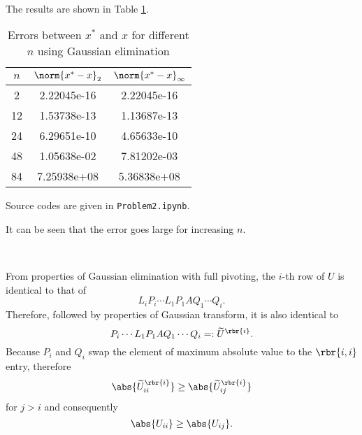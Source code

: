 \documentclass[english, nochinese]{../textmpls/pkupaper}
\begin{document}
\begin{thmquestion}
\ 
\begin{thmanswer}
The results are shown in Table \ref{Tbl:Gauss}.

\begin{table}[htbp]
\centering
\begin{tabular}{|c|c|c|}
\hline
$n$ & $ \norm{ x^{\ast} - x }_2 $ & $ \norm{ x^{\ast} - x }_{\infty} $ \\
\hline
2 & 2.22045e-16 & 2.22045e-16 \\
\hline
12 & 1.53738e-13 & 1.13687e-13 \\
\hline
24 & 6.29651e-10 & 4.65633e-10 \\
\hline
48 & 1.05638e-02 & 7.81202e-03 \\
\hline
84 & 7.25938e+08 & 5.36838e+08 \\
\hline
\end{tabular}
\caption{Errors between $x^{\ast}$ and $x$ for different $n$ using Gaussian elimination}
\label{Tbl:Gauss}
\end{table}
Source codes are given in \verb"Problem2.ipynb".

It can be seen that the error goes large for increasing $n$.
\end{thmanswer}
\end{thmquestion}

\begin{thmquestion}
\ 
\begin{thmproof}
From properties of Gaussian elimination with full pivoting, the $i$-th row of $U$ is identical to that of
\begin{equation}
L_i P_i \cdots L_1 P_1 A Q_1 \cdots Q_i.
\end{equation}
Therefore, followed by properties of Gaussian transform, it is also identical to
\begin{equation}
P_i \cdots L_1 P_1 A Q_1 \cdots Q_i =: \widetilde{U}^{\rbr{i}}.
\end{equation}
Because $P_i$ and $Q_i$ swap the element of maximum absolute value to the $ \rbr{ i, i } $ entry, therefore
\begin{equation}
\abs{\widetilde{U}^{\rbr{i}}_{ i i }} \ge \abs{\widetilde{U}^{\rbr{i}}_{ i j }}
\end{equation}
for $ j > i $ and consequently
\begin{equation}
\abs{U_{ i i }} \ge \abs{U_{ i j }}.
\end{equation}

\sqed
\end{thmproof}
\end{thmquestion}
\end{document}
